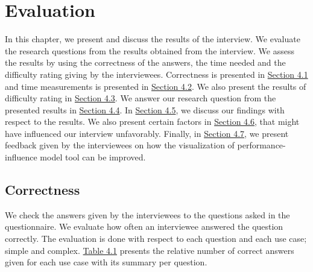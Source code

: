 \chapter{Evaluation}
\label{evaluation}

In this chapter, we present and discuss the results of the interview. We evaluate the research questions from the results obtained from the interview. We assess the results by using the correctness of the answers, the time needed and the difficulty rating giving by the interviewees. Correctness is presented in \hyperref[sec:4.1]{Section 4.1} and time measurements is presented in \hyperref[sec:4.2]{Section 4.2}. We also present the results of difficulty rating in \hyperref[sec:4.3]{Section 4.3}. We answer our research question from the presented results in \hyperref[sec:4.4]{Section 4.4}. In \hyperref[sec:4.5]{Section 4.5}, we discuss our findings with respect to the results. We also present certain factors in \hyperref[sec:4.6]{Section 4.6}, that might have influenced our interview unfavorably. Finally, in \hyperref[sec:4.7]{Section 4.7}, we present feedback given by the interviewees on how the visualization of performance-influence model tool can be improved. 

\section{Correctness}
\label{sec:4.1}
We check the answers given by the interviewees to the questions asked in the questionnaire. We evaluate how often an interviewee answered the question correctly. The evaluation is done with respect to each question and each use case; simple and complex. \hyperref[table:correctness]{Table 4.1} presents the relative number of correct answers given for each use case with its summary per question. 
 
